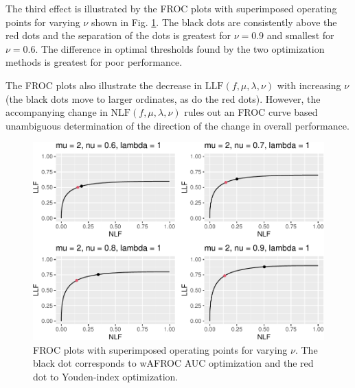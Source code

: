 \documentclass[
]{book}
\begin{document}
The third effect is illustrated by the FROC plots with superimposed operating points for varying \(\nu\) shown in Fig. \ref{fig:optim-op-point-vary-nu-froc}. The black dots are consistently above the red dots and the separation of the dots is greatest for \(\nu = 0.9\) and smallest for \(\nu = 0.6\). The difference in optimal thresholds found by the two optimization methods is greatest for poor performance.

The FROC plots also illustrate the decrease in \(\text{LLF} \left ( f, \mu, \lambda, \nu \right )\) with increasing \(\nu\) (the black dots move to larger ordinates, as do the red dots). However, the accompanying change in \(\text{NLF} \left ( f, \mu, \lambda, \nu \right )\) rules out an FROC curve based unambiguous determination of the direction of the change in overall performance.

\begin{figure}
\centering
\includegraphics{21-optim-op-point_files/figure-latex/optim-op-point-vary-nu-froc-1.pdf}
\caption{\label{fig:optim-op-point-vary-nu-froc}FROC plots with superimposed operating points for varying \(\nu\). The black dot corresponds to wAFROC AUC optimization and the red dot to Youden-index optimization.}
\end{figure}
\end{document}
